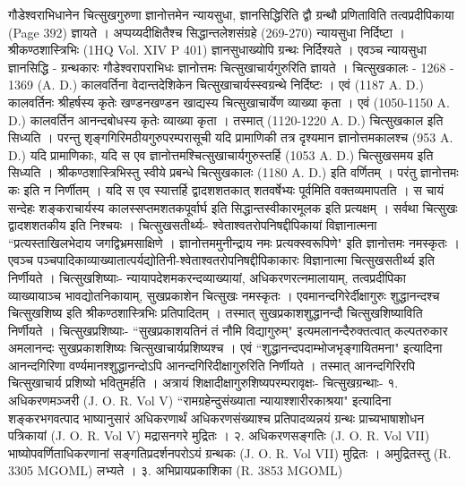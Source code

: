 गौडेश्वराभिधानेन चित्सुखगुरुणा ज्ञानोत्तमेन न्यायसुधा, ज्ञानसिद्धिरिति द्वौ ग्रन्थौ प्रणिताविति तत्वप्रदीपिकाया (Page 392) ज्ञायते । अप्पय्यदीक्षितैश्च सिद्धान्तलेशसंग्रहे (269-270) न्यायसुधा निर्दिष्टा । श्रीकण्ठशास्त्रिभिः (1HQ Vol. XIV P 401) ज्ञानसुधाख्योपि ग्रन्थः निर्दिश्यते । एवञ्च न्यायसुधा ज्ञानसिद्धि - ग्रन्थकारः गौडेश्वरापराभिधः ज्ञानोत्तमः चित्सुखाचार्यगुरुरिति ज्ञायते ।
चित्सुखकालः -
1268 - 1369 (A. D.) कालवर्तिना वेदान्तदेशिकेन चित्सुखाचार्यस्स्वग्रन्थे निर्दिष्टः । एवं (1187 A. D.) कालवर्तिनः श्रीहर्षस्य कृतेः खण्डनखण्डन खाद्यस्य चित्सुखाचार्येण व्याख्या कृता । एवं (1050-1150 A. D.) कालवर्तिन आनन्दबोधस्य कृतेः व्याख्या कृता । तस्मात् (1120-1220 A. D.) चित्सुखकाल इति सिध्यति ।
परन्तु शृङ्गगिरिमठीयगुरुपरम्परासूची यदि प्रामाणिकी तत्र दृश्यमान ज्ञानोत्तमकालश्च (953 A. D.) यदि प्रामाणिकाः, यदि स एव ज्ञानोत्तमश्चित्सुखाचार्यगुरुस्तर्हि (1053 A. D.) चित्सुखसमय इति सिध्यति । श्रीकण्ठशास्त्रिभिस्तु स्वीये प्रबन्धे चित्सुखकालः (1180 A. D.) इति वर्णितम् । परंतु ज्ञानोत्तमः कः इति न निर्णीतम् । यदि स एव स्यात्तर्हि द्वादशशतकात् शतवर्षेभ्यः पूर्वमिति वक्तव्यमापतति । स चायं सन्देहः शङ्कराचार्यस्य कालस्सप्तमशतकपूर्वार्घ इति सिद्धान्तस्वीकारमूलक इति प्रत्यक्षम् । सर्वथा चित्सुखः द्वादशशतकीय इति निश्चयः । 
चित्सुखसतीर्थ्यः-
श्वेताश्वतरोपनिषद्दीपिकायां विज्ञानात्मना ``प्रत्यस्ताखिलभेदाय जगद्विभ्रमसाक्षिणे । ज्ञानोत्तममुनीन्द्राय नमः प्रत्यक्स्वरूपिणे" इति ज्ञानोत्तमः नमस्कृतः । एवञ्च पञ्चपादिकाव्याख्यातात्पर्यद्योतिनी-श्वेताश्वतरोपनिषद्दीपिकाकारः विज्ञानात्मा चित्सुखसतीर्थ्य इति निर्णीयते ।
चित्सुखशिष्याः-
न्यायापदेशमकरन्दव्याख्यायां, अधिकरणरत्नमालायाम्, तत्वप्रदीपिका व्याख्यायाञ्च भावद्योतनिकायाम्, सुखप्रकाशेन चित्सुखः नमस्कृतः । एवमानन्दगिरेर्दीक्षागुरुः शुद्धानन्दश्च चित्सुखशिष्य इति श्रीकण्ठशास्त्रिभिः प्रतिपादितम् । तस्मात् सुखप्रकाशशुद्धानन्दौ चित्सुखशिष्याविति निर्णीयते ।
चित्सुखप्रशिष्याः-
``सुखप्रकाशयतिनं तं नौमि विद्यागुरुम्" इत्यमलानन्दैरुक्तत्वात् कल्पतरुकार अमलानन्दः सुखप्रकाशशिष्यः चित्सुखाचार्यप्रशिष्यश्च । एवं ``शुद्धानन्दपदाम्भोजभृङ्गायितमना" इत्यादिना आनन्दगिरिणा वर्ण्यमानश्शुद्धानन्दोऽपि आनन्दगिरिदीक्षागुरुरिति निर्णीयते । तस्मात् आनन्दगिरिरपि चित्सुखाचार्य प्रशिष्यो भवितुमर्हति ।
अत्रायं शिक्षादीक्षागुरुशिष्यपरम्परावृक्षः-
चित्सुखग्रन्थाः-
१. अधिकरणमञ्जरी (J. O. R. Vol V)
``रामग्रहेन्दुसंख्याता न्यायाश्शारीरकाश्रया" इत्यादिना शङ्करभगवत्पाद भाष्यानुसारं अधिकरणार्थं अधिकरणसंख्याश्च प्रतिपादव्यन्नयं ग्रन्थः प्राच्यभाषाशोधन पत्रिकायां (J. O. R. Vol V) मद्रासनगरे मुद्रितः ।
२. अधिकरणसङ्गतिः (J. O. R. Vol VII)
भाष्योपवर्णिताधिकरणानां सङ्गतिप्रदर्शनपरोऽयं ग्रन्थकः (J. O. R. Vol VII) मुद्रितः । अमुद्रितस्तु (R. 3305 MGOML) लभ्यते ।
३. अभिप्रायप्रकाशिका (R. 3853 MGOML)
